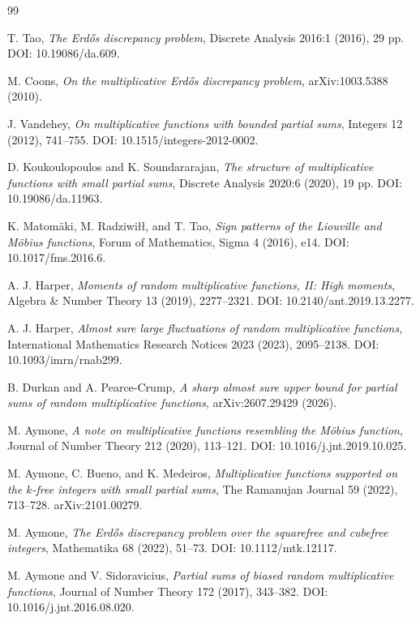 \documentclass[11pt]{article}
\begin{document}
\begin{thebibliography}{99}

T. Tao,
\emph{The Erdős discrepancy problem},
Discrete Analysis 2016:1 (2016), 29 pp.
DOI: 10.19086/da.609.

M. Coons,
\emph{On the multiplicative Erdős discrepancy problem},
arXiv:1003.5388 (2010).

J. Vandehey,
\emph{On multiplicative functions with bounded partial sums},
Integers 12 (2012), 741--755.
DOI: 10.1515/integers-2012-0002.

D. Koukoulopoulos and K. Soundararajan,
\emph{The structure of multiplicative functions with small partial sums},
Discrete Analysis 2020:6 (2020), 19 pp.
DOI: 10.19086/da.11963.

K. Matomäki, M. Radziwiłł, and T. Tao,
\emph{Sign patterns of the Liouville and Möbius functions},
Forum of Mathematics, Sigma 4 (2016), e14.
DOI: 10.1017/fms.2016.6.

A. J. Harper,
\emph{Moments of random multiplicative functions, II: High moments},
Algebra \& Number Theory 13 (2019), 2277--2321.
DOI: 10.2140/ant.2019.13.2277.

A. J. Harper,
\emph{Almost sure large fluctuations of random multiplicative functions},
International Mathematics Research Notices 2023 (2023), 2095--2138.
DOI: 10.1093/imrn/rnab299.

B. Durkan and A. Pearce-Crump,
\emph{A sharp almost sure upper bound for partial sums of random multiplicative functions},
arXiv:2607.29429 (2026).

M. Aymone,
\emph{A note on multiplicative functions resembling the Möbius function},
Journal of Number Theory 212 (2020), 113--121.
DOI: 10.1016/j.jnt.2019.10.025.

M. Aymone, C. Bueno, and K. Medeiros,
\emph{Multiplicative functions supported on the $k$-free integers with small partial sums},
The Ramanujan Journal 59 (2022), 713--728.
arXiv:2101.00279.

M. Aymone,
\emph{The Erdős discrepancy problem over the squarefree and cubefree integers},
Mathematika 68 (2022), 51--73.
DOI: 10.1112/mtk.12117.

M. Aymone and V. Sidoravicius,
\emph{Partial sums of biased random multiplicative functions},
Journal of Number Theory 172 (2017), 343--382.
DOI: 10.1016/j.jnt.2016.08.020.


\end{thebibliography}
\end{document}
